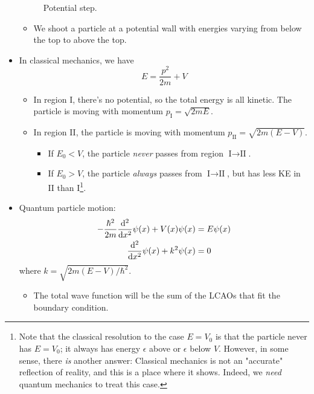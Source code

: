 \documentclass[../notes.tex]{subfiles}
\begin{document}
\begin{itemize}
\begin{figure}[h!]
        \caption{Potential step.}
        \label{fig:potentialStep}
    \end{figure}
    \begin{itemize}
        \item We shoot a particle at a potential wall with energies varying from below the top to above the top.
    \end{itemize}
    \item In classical mechanics, we have
    \begin{equation*}
        E = \frac{p^2}{2m}+V
    \end{equation*}
    \begin{itemize}
        \item In region I, there's no potential, so the total energy is all kinetic. The particle is moving with momentum $p_\text{I}=\sqrt{2mE}$.
        \item In region II, the particle is moving with momentum $p_\text{II}=\sqrt{2m(E-V)}$.
        \begin{itemize}
            \item If $E_0<V$, the particle \emph{never} passes from region $\text{I}\to\text{II}$.
            \item If $E_0>V$, the particle \emph{always} passes from $\text{I}\to\text{II}$, but has less KE in II than I\footnote{Note that the classical resolution to the case $E=V_0$ is that the particle never has $E=V_0$; it always has energy $\epsilon$ above or $\epsilon$ below $V$. However, in some sense, there \emph{is} another answer: Classical mechanics is not an "accurate" reflection of reality, and this is a place where it shows. Indeed, we \emph{need} quantum mechanics to treat this case.}.
        \end{itemize}
    \end{itemize}
    \item Quantum particle motion:
    \begin{align*}
        -\frac{\hbar^2}{2m}\dv[2]{x}\psi(x)+V(x)\psi(x) &= E\psi(x)\\
        \dv[2]{x}\psi(x)+k^2\psi(x) &= 0
    \end{align*}
    where $k=\sqrt{2m(E-V)/\hbar^2}$.
    \begin{itemize}
        \item The total wave function will be the sum of the LCAOs that fit the boundary condition.

\end{itemize}
\end{itemize}
\end{document}
